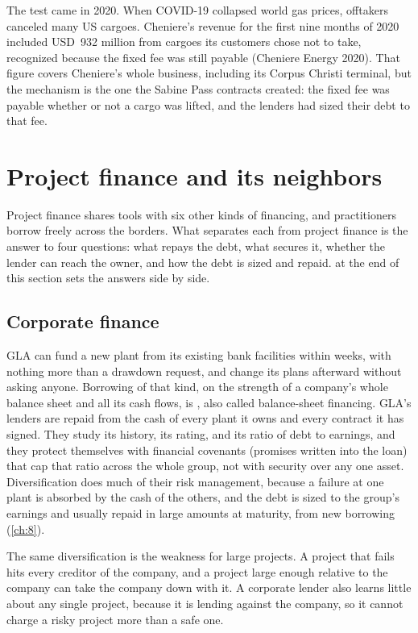 The test came in 2020. When COVID-19 collapsed world gas prices, offtakers canceled many US cargoes. Cheniere's revenue for the first nine months of 2020 included USD~932 million from cargoes its customers chose not to take, recognized because the fixed fee was still payable (Cheniere Energy 2020). That figure covers Cheniere's whole business, including its Corpus Christi terminal, but the mechanism is the one the Sabine Pass contracts created: the fixed fee was payable whether or not a cargo was lifted, and the lenders had sized their debt to that fee.

\section{Project finance and its neighbors}\label{sec:2.4}

Project finance shares tools with six other kinds of financing, and practitioners borrow freely across the borders. What separates each from project finance is the answer to four questions: what repays the debt, what secures it, whether the lender can reach the owner, and how the debt is sized and repaid.  at the end of this section sets the answers side by side.

\subsection{Corporate finance}\label{ssec:2.4.1}

GLA can fund a new plant from its existing bank facilities within weeks, with nothing more than a drawdown request, and change its plans afterward without asking anyone. Borrowing of that kind, on the strength of a company's whole balance sheet and all its cash flows, is , also called balance-sheet financing. GLA's lenders are repaid from the cash of every plant it owns and every contract it has signed. They study its history, its rating, and its ratio of debt to earnings, and they protect themselves with financial covenants (promises written into the loan) that cap that ratio across the whole group, not with security over any one asset. Diversification does much of their risk management, because a failure at one plant is absorbed by the cash of the others, and the debt is sized to the group's earnings and usually repaid in large amounts at maturity, from new borrowing (\cref{ch:8}).

The same diversification is the weakness for large projects. A project that fails hits every creditor of the company, and a project large enough relative to the company can take the company down with it. A corporate lender also learns little about any single project, because it is lending against the company, so it cannot charge a risky project more than a safe one.

